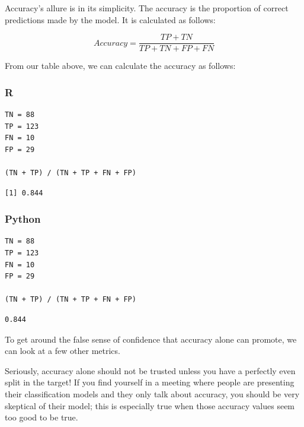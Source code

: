 \documentclass[
  letterpaper,
]{krantz}
\begin{document}
Accuracy's allure is in its simplicity. The accuracy is the proportion
of correct predictions made by the model. It is calculated as follows:

\[Accuracy = \frac{TP + TN}{TP + TN + FP + FN}\]

From our table above, we can calculate the accuracy as follows:

\subsubsection{R}

\begin{verbatim}
TN = 88
TP = 123
FN = 10
FP = 29

(TN + TP) / (TN + TP + FN + FP)
\end{verbatim}

\begin{verbatim}
[1] 0.844
\end{verbatim}

\subsubsection{Python}

\begin{verbatim}
TN = 88
TP = 123
FN = 10
FP = 29

(TN + TP) / (TN + TP + FN + FP)
\end{verbatim}

\begin{verbatim}
0.844
\end{verbatim}

To get around the false sense of confidence that accuracy alone can
promote, we can look at a few other metrics.

\begin{tcolorbox}[enhanced jigsaw, toprule=.15mm, arc=.35mm, rightrule=.15mm, bottomrule=.15mm, leftrule=.75mm, breakable, colframe=quarto-callout-warning-color-frame, colback=white, left=2mm, opacityback=0]
\begin{minipage}[t]{5.5mm}
\textcolor{quarto-callout-warning-color}{\faExclamationTriangle}
\end{minipage}%
\begin{minipage}[t]{\textwidth - 5.5mm}

Seriously, accuracy alone should not be trusted unless you have a
perfectly even split in the target! If you find yourself in a meeting
where people are presenting their classification models and they only
talk about accuracy, you should be very skeptical of their model; this
is especially true when those accuracy values seem too good to be true.

\end{minipage}%
\end{tcolorbox}
\end{document}
